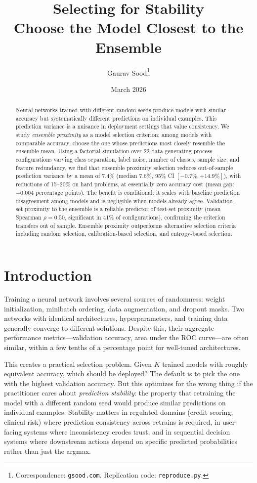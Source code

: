 \documentclass[11pt]{article}
\title{\textbf{Selecting for Stability} \\[6pt]
  \large Choose the Model Closest to the Ensemble}
\author{Gaurav Sood\thanks{Correspondence: \texttt{gsood.com}. Replication code: \texttt{reproduce.py}.}}
\date{March 2026}
\begin{document}
\maketitle

\begin{abstract}
\noindent
Neural networks trained with different random seeds produce models with similar accuracy but systematically different predictions on individual examples.
This prediction variance is a nuisance in deployment settings that value consistency.
We study \emph{ensemble proximity} as a model selection criterion: among models with comparable accuracy, choose the one whose predictions most closely resemble the ensemble mean.
Using a factorial simulation over 22 data-generating process configurations varying class separation, label noise, number of classes, sample size, and feature redundancy, we find that ensemble proximity selection reduces out-of-sample prediction variance by a mean of 7.4\% (median 7.6\%, 95\% CI $[-0.7\%, +14.9\%]$), with reductions of 15--20\% on hard problems, at essentially zero accuracy cost (mean gap: $+0.004$ percentage points).
The benefit is conditional: it scales with baseline prediction disagreement among models and is negligible when models already agree.
Validation-set proximity to the ensemble is a reliable predictor of test-set proximity (mean Spearman $\rho = 0.50$, significant in 41\% of configurations), confirming the criterion transfers out of sample.
Ensemble proximity outperforms alternative selection criteria including random selection, calibration-based selection, and entropy-based selection.
\end{abstract}

\section{Introduction}
\label{sec:intro}

Training a neural network involves several sources of randomness: weight initialization, minibatch ordering, data augmentation, and dropout masks.
Two networks with identical architectures, hyperparameters, and training data generally converge to different solutions.
Despite this, their aggregate performance metrics---validation accuracy, area under the ROC curve---are often similar, within a few tenths of a percentage point for well-tuned architectures.

This creates a practical selection problem.
Given $K$ trained models with roughly equivalent accuracy, which should be deployed?
The default is to pick the one with the highest validation accuracy.
But this optimizes for the wrong thing if the practitioner cares about \emph{prediction stability}: the property that retraining the model with a different random seed would produce similar predictions on individual examples.
Stability matters in regulated domains (credit scoring, clinical risk) where prediction consistency across retrains is required, in user-facing systems where inconsistency erodes trust, and in sequential decision systems where downstream actions depend on specific predicted probabilities rather than just the argmax.
\end{document}
